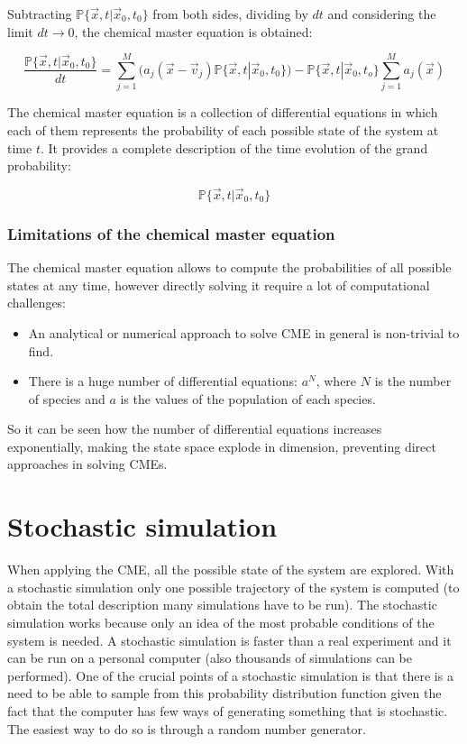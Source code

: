       Subtracting $\mathbb{P}\{\vec{x}, t|\vec{x}_0, t_0\}$ from both sides, dividing by $dt$ and considering the limit $dt\rightarrow 0$, the chemical master equation is obtained:

    $$\frac{\mathbb{P}\{\vec{x},t|\vec{x}_0,t_0\}}{dt}= \sum_{j=1}^{M}(a_j(\vec{x}-\vec{v}_j)\mathbb{P}\{\vec{x},t|\vec{x}_0,t_0\})- \mathbb{P}\{\vec{x},t|\vec{x}_0,t_o\}\sum^M_{j=1}a_j(\vec{x})$$

    The chemical master equation is a collection of differential equations in which each of them represents the probability of each possible state of the system at time $t$.
    It provides a complete description of the time evolution of the grand probability:

    $$\mathbb{P}\{\vec{x}, t|\vec{x}_0, t_0\}$$


    \subsubsection{Limitations of the chemical master equation}
    The chemical master equation allows to compute the probabilities of all possible states at any time, however directly solving it require a lot of computational challenges:

    \begin{multicols}{2}
      \begin{itemize}
        \item An analytical or numerical approach to solve CME in general is non-trivial to find.
        \item There is a huge number of differential equations: $a^N$, where $N$ is the number of species and $a$ is the values of the population of each species.
      \end{itemize}
    \end{multicols}

    So it can be seen how the number of differential equations increases exponentially, making the state space explode in dimension, preventing direct approaches in solving CMEs.

\section{Stochastic simulation}
When applying the CME, all the possible state of the system are explored.
With a stochastic simulation only one possible trajectory of the system is computed (to obtain the total description many simulations have to be run).
The stochastic simulation works because only an idea of the most probable conditions of the system is needed.
A stochastic simulation is faster than a real experiment and it can be run on a personal computer (also thousands of simulations can be performed).
One of the crucial points of a stochastic simulation is that there is a need to be able to sample from this probability distribution  function given the fact that the computer has few ways of generating something that is stochastic.
The easiest way to do so is through a random number generator.

